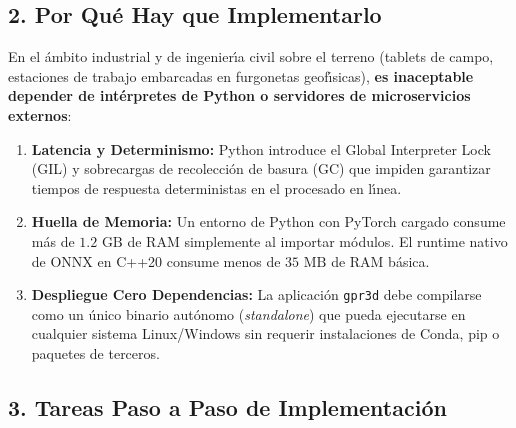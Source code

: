 \documentclass[11pt,a4paper]{article}
\begin{document}
\subsection{2. Por Qu{\'e} Hay que Implementarlo}
En el {\'a}mbito industrial y de ingenier{\'\i}a civil sobre el terreno (tablets de campo, estaciones de trabajo embarcadas en furgonetas geof{\'\i}sicas), \textbf{es inaceptable depender de int{\'e}rpretes de Python o servidores de microservicios externos}:
\begin{enumerate}
    \item \textbf{Latencia y Determinismo:} Python introduce el Global Interpreter Lock (GIL) y sobrecargas de recolecci{\'o}n de basura (GC) que impiden garantizar tiempos de respuesta deterministas en el procesado en l{\'\i}nea.
    \item \textbf{Huella de Memoria:} Un entorno de Python con PyTorch cargado consume m{\'a}s de $1.2\text{ GB}$ de RAM simplemente al importar m{\'o}dulos. El runtime nativo de ONNX en C++20 consume menos de $35\text{ MB}$ de RAM b{\'a}sica.
    \item \textbf{Despliegue Cero Dependencias:} La aplicaci{\'o}n \texttt{gpr3d} debe compilarse como un {\'u}nico binario aut{\'o}nomo (\textit{standalone}) que pueda ejecutarse en cualquier sistema Linux/Windows sin requerir instalaciones de Conda, pip o paquetes de terceros.
\end{enumerate}

\subsection{3. Tareas Paso a Paso de Implementaci{\'o}n}
\end{document}
